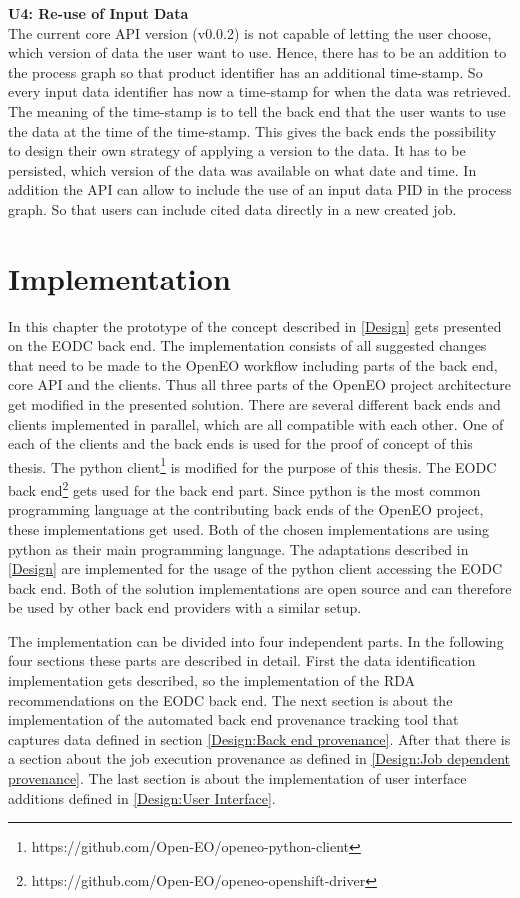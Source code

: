 \documentclass[draft,final]{vutinfth} %
\begin{document}
\textbf{U4: Re-use of Input Data} \\
The current core API version (v0.0.2) is not capable of letting the user choose, which version of data the user want to use. Hence, there has to be an addition to the process graph so that product identifier has an additional time-stamp. So every input data identifier has now a time-stamp for when the data was retrieved. The meaning of the time-stamp is to tell the back end that the user wants to use the data at the time of the time-stamp. This gives the back ends the possibility to design their own strategy of applying a version to the data. It has to be persisted, which version of the data was available on what date and time. In addition the API can allow to include the use of an input data PID in the process graph. So that users can include cited data directly in a new created job.  


\chapter{Implementation}\label{Implementation}
In this chapter the prototype of the concept described in \ref{Design} gets presented on the EODC back end. The implementation consists of all suggested changes that need to be made to the OpenEO workflow including parts of the back end, core API and the clients. Thus all three parts of the OpenEO project architecture get modified in the presented solution. There are several different back ends and clients implemented in parallel, which are all compatible with each other. One of each of the clients and the back ends is used for the proof of concept of this thesis. The python client\footnote{https://github.com/Open-EO/openeo-python-client} is modified for the purpose of this thesis. The EODC back end\footnote{https://github.com/Open-EO/openeo-openshift-driver} gets used for the back end part. Since python is the most common programming language at the contributing back ends of the OpenEO project, these implementations get used. Both of the chosen implementations are using python as their main programming language. The adaptations described in \ref{Design} are implemented for the usage of the python client accessing the EODC back end. Both of the solution implementations are open source and can therefore be used by other back end providers with a similar setup.  

The implementation can be divided into four independent parts. In the following four sections these parts are described in detail. First the data identification implementation gets described, so the implementation of the RDA recommendations on the EODC back end. The next section is about the implementation of the automated back end provenance tracking tool that captures data defined in section \ref{Design:Back end provenance}. After that there is a section about the job execution provenance as defined in \ref{Design:Job dependent provenance}. The last section is about the implementation of user interface additions defined in \ref{Design:User Interface}.     
\end{document}
